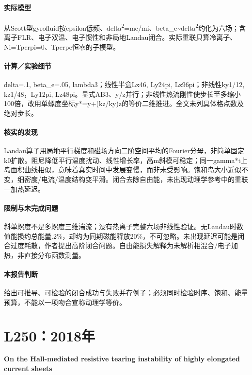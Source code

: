 \paragraph{实际模型}从Scott型gyrofluid按epsilon低频、delta\textsuperscript{2}=me/mi、beta\_e\textasciitilde{}delta\textsuperscript{2}约化为六场；含离子FLR、电子双温、电子惯性和非局地Landau闭合。实际重联只算冷离子、Ni=Tperpi=0、Tperpe恒零的子模型。

\paragraph{计算／实验细节}delta=.1, beta\_e=.05, lambda3；线性半盒Lx46, Ly24pi, Lz96pi；非线性ky1/12, kz1/48，Ly12pi, Lz48pi。显式AB3、y/z并行；非线性热流刚性使步长至多缩小100倍，改用单螺度坐标y*=y+(kz/ky)z的等价二维推进。全文未列具体格点数及绝对步长。

\paragraph{核实的发现}Landau算子用局地平行梯度和磁场方向二阶空间平均的Fourier分母，非简单固定k0扩散。阻尼降低平行温度扰动、线性增长率，高m斜模可稳定；同一gamma*t上岛面积曲线相似，意味着真实时间中发展变慢，而非未受影响。饱和岛大小近似不变，细密度/电流/温度结构变平滑。闭合去除自由能，未出现动理学参考中的重联—加热延迟。

\paragraph{限制与未完成问题}斜单螺度不是多螺度三维湍流；没有热离子完整六场非线性验证。无Landau时数值能损约总能量.2\%，却约为同期磁能释放20\%，不可忽略。未出现延迟可能是闭合过度耗散，作者提出高阶闭合问题。自由能损失解释为未解析相混合/电子加热，非直接分布函数测量。

\paragraph{本报告判断}给出可推导、可检验的闭合成功与失败并存例子；必须同时检验时序、饱和、能量预算，不能以一项吻合宣称动理学等价。

\section{L250：2018年}\label{paper:L250}

\textbf{On the Hall-mediated resistive tearing instability of highly elongated current sheets}\citep{L250}\

